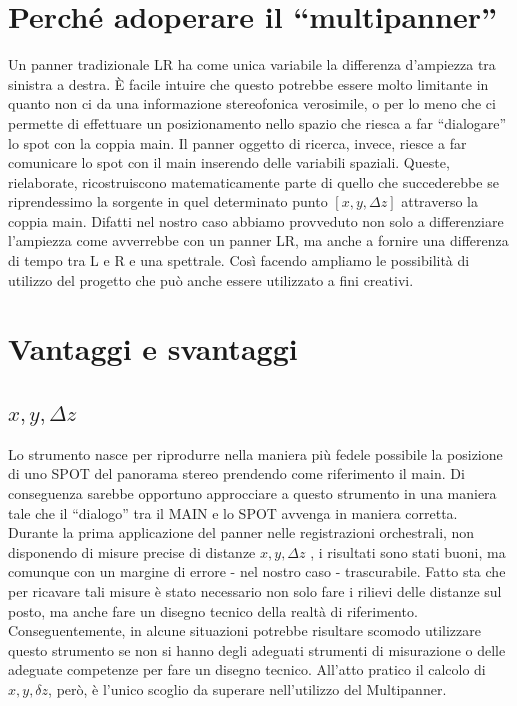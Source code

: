 \documentclass{article}
\begin{document}
\section{Perché adoperare il ``multipanner''}
    
    Un panner tradizionale LR ha come unica variabile la differenza d'ampiezza tra sinistra a destra. È facile intuire che questo potrebbe essere molto limitante in quanto non ci da una informazione stereofonica verosimile, o per lo meno che ci permette di effettuare un posizionamento nello spazio che riesca a far ``dialogare'' lo spot con la coppia main. Il panner oggetto di ricerca, invece, riesce a far comunicare lo spot con il main inserendo delle variabili spaziali. 
    Queste, rielaborate, ricostruiscono matematicamente parte di quello che succederebbe se riprendessimo la sorgente in quel determinato punto $[x, y, \Delta z]$ attraverso la coppia main. 
    Difatti nel nostro caso abbiamo provveduto non solo a differenziare l'ampiezza come avverrebbe con un panner LR, ma anche a fornire una differenza di tempo tra L e R e una spettrale. Così facendo ampliamo le possibilità di utilizzo del progetto che può anche essere utilizzato a fini creativi.

\section{Vantaggi e svantaggi}

\subsection{$x, y, \Delta z$}
    Lo strumento nasce per riprodurre nella maniera più fedele possibile la posizione di uno SPOT del panorama stereo prendendo come riferimento il main. Di conseguenza sarebbe opportuno approcciare a questo strumento in una maniera tale che il ``dialogo'' tra il MAIN e lo SPOT avvenga in maniera corretta.
    Durante la prima applicazione del panner nelle registrazioni orchestrali, non disponendo di misure precise di distanze $x, y, \Delta z$ , i risultati sono stati buoni, ma comunque con un margine di errore - nel nostro caso - trascurabile.
    Fatto sta che per ricavare tali misure è stato necessario non solo fare i rilievi delle distanze sul posto, ma anche fare un disegno tecnico della realtà di riferimento. Conseguentemente, in alcune situazioni potrebbe risultare scomodo utilizzare questo strumento se non si hanno degli adeguati strumenti di misurazione o delle adeguate competenze per fare un disegno tecnico. All'atto pratico il calcolo di  $x, y, \delta z$, però, è l'unico scoglio da superare nell'utilizzo del Multipanner.
\end{document}
